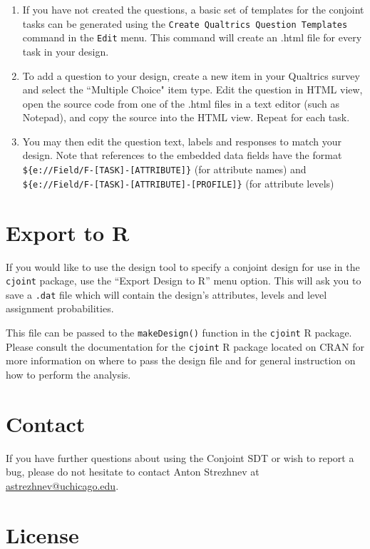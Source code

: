 \documentclass[12pt]{article}
\begin{document}
\begin{enumerate}
\item If you have not created the questions, a basic set of templates for the conjoint tasks can be generated using the \texttt{Create Qualtrics Question Templates} command in the \texttt{Edit} menu. This command will create an .html file for every task in your design.
\item To add a question to your design, create a new item in your Qualtrics survey and select the ``Multiple Choice" item type. Edit the question in HTML view, open the source code from one of the .html files in a text editor (such as Notepad), and copy the source into the HTML view. Repeat for each task.
\item You may then edit the question text, labels and responses to match your design. Note that references to the embedded data fields have the format \texttt{\$\{e://Field/F-[TASK]-[ATTRIBUTE]\}} (for attribute names) and \texttt{\$\{e://Field/F-[TASK]-[ATTRIBUTE]-[PROFILE]\}} (for attribute levels)

\end{enumerate}

\section{Export to R}

If you would like to use the design tool to specify a conjoint design for use in the \texttt{cjoint} package, use the ``Export Design to R'' menu option. This will ask you to save a \texttt{.dat} file which will contain the design's attributes, levels and level assignment probabilities. 

This file can be passed to the \texttt{makeDesign()} function in the \texttt{cjoint} R package. Please consult the documentation for the \texttt{cjoint} R package located on CRAN for more information on where to pass the design file and for general instruction on how to perform the analysis.

\section{Contact}

If you have further questions about using the Conjoint SDT or wish to report a bug, please do not hesitate to contact Anton Strezhnev at \href{mailto:astrezhnev@uchicago.edu}{astrezhnev@uchicago.edu}.

\section{License}
\end{document}
